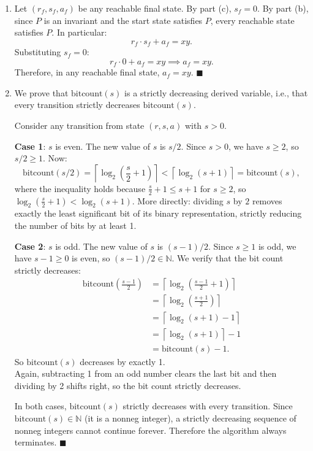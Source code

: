 \documentclass[11pt]{article}
\begin{document}
\begin{enumerate}[label=\textbf{(\alph*)}]
\item Let $(r_f, s_f, a_f)$ be any reachable final state. By part (c), $s_f = 0$.
By part (b), since $P$ is an invariant and the start state satisfies $P$, every
reachable state satisfies $P$. In particular:
\[
    r_f \cdot s_f + a_f = xy.
\]
Substituting $s_f = 0$:
\[
    r_f \cdot 0 + a_f = xy \implies a_f = xy.
\]
Therefore, in any reachable final state, $a_f = xy$. $\blacksquare$

\item We prove that $\text{bitcount}(s)$ is a strictly decreasing derived variable,
i.e., that every transition strictly decreases $\text{bitcount}(s)$.

Consider any transition from state $(r, s, a)$ with $s > 0$.

\textbf{Case 1}: $s$ is even. The new value of $s$ is $s/2$. Since $s > 0$, we have
$s \geq 2$, so $s/2 \geq 1$. Now:
\[
    \text{bitcount}(s/2) = \left\lceil \log_2\!\left(\frac{s}{2} + 1\right) \right\rceil
    < \left\lceil \log_2(s + 1) \right\rceil = \text{bitcount}(s),
\]
where the inequality holds because $\frac{s}{2} + 1 \leq s + 1$ for $s \geq 2$, so
$\log_2(\frac{s}{2}+1) < \log_2(s+1)$. More directly: dividing $s$ by $2$ removes
exactly the least significant bit of its binary representation, strictly reducing the
number of bits by at least 1.

\textbf{Case 2}: $s$ is odd. The new value of $s$ is $(s-1)/2$. Since $s \geq 1$
is odd, we have $s - 1 \geq 0$ is even, so $(s-1)/2 \in \mathbb{N}$. We verify that
the bit count strictly decreases:
\[
\begin{aligned}
\text{bitcount}\!\left(\frac{s-1}{2}\right)
&= \left\lceil \log_2\!\left(\frac{s-1}{2}+1\right) \right\rceil \\
&= \left\lceil \log_2\!\left(\frac{s+1}{2}\right) \right\rceil \\
&= \left\lceil \log_2(s+1)-1 \right\rceil \\
&= \left\lceil \log_2(s+1) \right\rceil - 1 \\
&= \text{bitcount}(s)-1.
\end{aligned}
\]
So $\text{bitcount}(s)$ decreases by exactly 1. \checkmark \\
Again, subtracting 1 from an odd number clears the last bit and then dividing by 2
shifts right, so the bit count strictly decreases.

In both cases, $\text{bitcount}(s)$ strictly decreases with every transition.
Since $\text{bitcount}(s) \in \mathbb{N}$ (it is a nonneg integer), a strictly
decreasing sequence of nonneg integers cannot continue forever. Therefore the algorithm
always terminates. $\blacksquare$


\end{enumerate}
\end{document}
